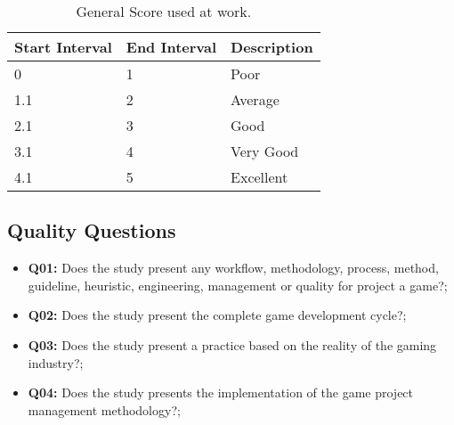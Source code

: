 \documentclass [11pt]{article}
\begin{document}
\begin{table}[!htb]
\caption[General Scores used at work]{General Score used at work.}
\label{tab:genscores}
\centering
\begin{tabular}{@{}lll@{}}
\toprule
\textbf{Start Interval} & \textbf{End Interval} & \textbf{Description} \\ \midrule
0 & 1 & Poor \\ \bottomrule 
1.1 & 2 & Average \\ \bottomrule 
2.1 & 3 & Good \\ \bottomrule 
3.1 & 4 & Very Good \\ \bottomrule 
4.1 & 5 & Excellent \\ \bottomrule 
\end{tabular}
\end{table}

\subsection{Quality Questions}
\begin{itemize}
\item \textbf{Q01: } Does the study present any workflow, methodology, process, method, guideline, heuristic, engineering, management or quality for project a game?;
\item \textbf{Q02: } 	Does the study present the complete game development cycle?;
\item \textbf{Q03: } Does the study present a practice based on the reality of the gaming industry?;
\item \textbf{Q04: } Does the study presents the implementation of the game project management methodology?;
\end{itemize}
\end{document}
